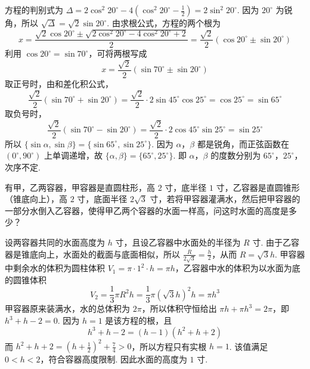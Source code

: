 \begin{solution}
方程的判别式为 \(\Delta=2\cos^2 20^\circ-4\left( \cos^2 20^\circ-\frac{1}{2} \right)=2\sin^2 20^\circ\). 因为 \(20^\circ\) 为锐角，所以 \(\sqrt{\Delta}=\sqrt{2}\sin20^\circ\). 由求根公式，方程的两个根为
\[
x=\frac{\sqrt{2}\cos20^\circ\pm\sqrt{2\cos^2 20^\circ-4\cos^2 20^\circ+2}}{2}=\frac{\sqrt{2}}{2}\left(\cos20^\circ\pm\sin20^\circ\right)
\]
利用 \(\cos20^\circ=\sin70^\circ\)，可将两根写成
\[
x=\frac{\sqrt{2}}{2}\left(\sin70^\circ\pm\sin20^\circ\right)
\]
取正号时，由和差化积公式，
\[
\frac{\sqrt{2}}{2}\left(\sin70^\circ+\sin20^\circ\right)=\frac{\sqrt{2}}{2}\cdot 2\sin45^\circ\cos25^\circ=\cos25^\circ=\sin65^\circ
\]
取负号时，
\[
\frac{\sqrt{2}}{2}\left(\sin70^\circ-\sin20^\circ\right)=\frac{\sqrt{2}}{2}\cdot 2\cos45^\circ\sin25^\circ=\sin25^\circ
\]
所以 \(\{\sin\alpha,\sin\beta\}=\{\sin65^\circ,\sin25^\circ\}\). 因为 \(\alpha\)，\(\beta\) 都是锐角，而正弦函数在 \((0^\circ,90^\circ)\) 上单调递增，故 \(\{\alpha,\beta\}=\{65^\circ,25^\circ\}\). 即 \(\alpha\)，\(\beta\) 的度数分别为 \(65^\circ\)，\(25^\circ\)，次序不定.
\end{solution}

\begin{problem}
有甲，乙两容器，甲容器是直圆柱形，高 \(2\text{ 寸}\)，底半径 \(1\text{ 寸}\)，乙容器是直圆锥形（锥底向上），高 \(2\text{ 寸}\)，底面半径 \(2\sqrt{3}\text{ 寸}\)，若将甲容器灌满水，然后把甲容器的一部分水倒入乙容器，使得甲乙两个容器的水面一样高，问这时水面的高度是多少？
\end{problem}

\begin{solution}
设两容器共同的水面高度为 \(h\text{ 寸}\)，且设乙容器中水面处的半径为 \(R\text{ 寸}\). 由于乙容器是锥底向上，水面处的截面与底面相似，所以
\(\frac{R}{2\sqrt{3}}=\frac{h}{2}\)，从而 \(R=\sqrt{3}h\). 甲容器中剩余水的体积为圆柱体积 \(V_1=\pi\cdot 1^2\cdot h=\pi h\)，乙容器中水的体积为以水面为底的圆锥体积
\[
V_2=\frac{1}{3}\pi R^2h=\frac{1}{3}\pi\left(\sqrt{3}h\right)^2h=\pi h^3
\]
甲容器原来装满水，水的总体积为 \(2\pi\)，所以体积守恒给出 \(\pi h+\pi h^3=2\pi\)，即 \(h^3+h-2=0\). 因为 \(h=1\) 是该方程的根，且
\[
h^3+h-2=\left( h-1 \right)\left( h^2+h+2 \right)
\]
而 \(h^2+h+2=\left( h+\frac{1}{2} \right)^2+\frac{7}{4}>0\)，所以方程只有实根 \(h=1\). 该值满足 \(0<h<2\)，符合容器高度限制. 因此水面的高度为 \(1\text{ 寸}\).

\end{solution}

